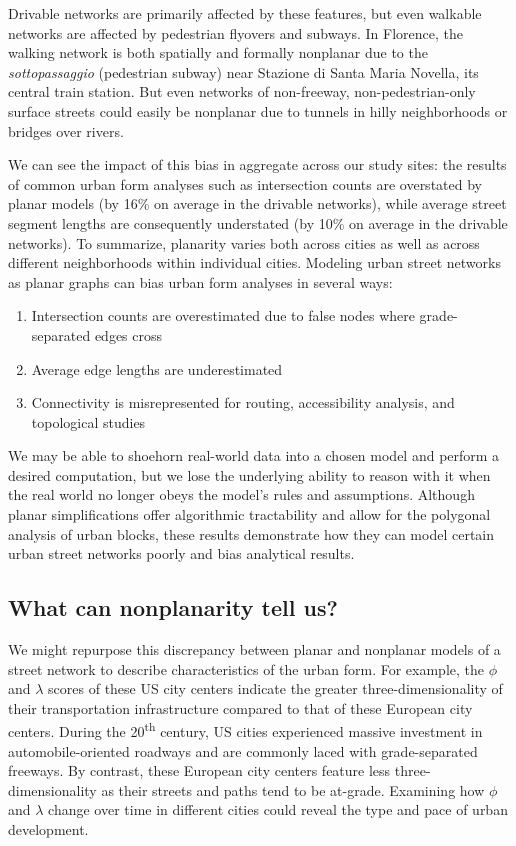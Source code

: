 \documentclass[Afour,sageh,times]{sagej}
\begin{document}
Drivable networks are primarily affected by these features, but even walkable networks are affected by pedestrian flyovers and subways. In Florence, the walking network is both spatially and formally nonplanar due to the \textit{sottopassaggio} (pedestrian subway) near Stazione di Santa Maria Novella, its central train station. But even networks of non-freeway, non-pedestrian-only surface streets could easily be nonplanar due to tunnels in hilly neighborhoods or bridges over rivers.

We can see the impact of this bias in aggregate across our study sites: the results of common urban form analyses such as intersection counts are overstated by planar models (by 16\% on average in the drivable networks), while average street segment lengths are consequently understated (by 10\% on average in the drivable networks). To summarize, planarity varies both across cities as well as across different neighborhoods within individual cities. Modeling urban street networks as planar graphs can bias urban form analyses in several ways:

\begin{enumerate}
	\item{Intersection counts are overestimated due to false nodes where grade-separated edges cross}
	\item{Average edge lengths are underestimated}
	\item{Connectivity is misrepresented for routing, accessibility analysis, and topological studies}
\end{enumerate}

We may be able to shoehorn real-world data into a chosen model and perform a desired computation, but we lose the underlying ability to reason with it when the real world no longer obeys the model's rules and assumptions. Although planar simplifications offer algorithmic tractability and allow for the polygonal analysis of urban blocks, these results demonstrate how they can model certain urban street networks poorly and bias analytical results.


\subsection{What can nonplanarity tell us?}

We might repurpose this discrepancy between planar and nonplanar models of a street network to describe characteristics of the urban form. For example, the $\phi$ and $\lambda$ scores of these US city centers indicate the greater three-dimensionality of their transportation infrastructure compared to that of these European city centers. During the 20\textsuperscript{th} century, US cities experienced massive investment in automobile-oriented roadways and are commonly laced with grade-separated freeways. By contrast, these European city centers feature less three-dimensionality as their streets and paths tend to be at-grade. Examining how $\phi$ and $\lambda$ change over time in different cities could reveal the type and pace of urban development.
\end{document}
